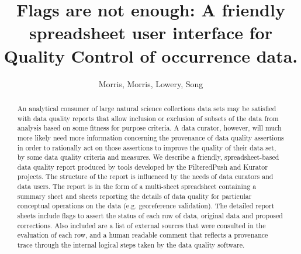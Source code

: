 \documentclass{article}
\begin{document}
\title{Flags are not enough: A friendly spreadsheet user interface for Quality Control of occurrence data.}
\author{Morris, Morris, Lowery, Song}
\begin{abstract}
An analytical consumer of large natural science collections data sets may be satisfied with data quality reports that allow inclusion or exclusion of subsets of the data from analysis based on some fitness for purpose criteria.  A data curator, however, will much more likely need more information concerning the provenance of data quality assertions in order to rationally act on those assertions to improve the quality of their data set, by some data quality criteria and measures.  We describe a friendly, spreadsheet-based data quality report produced by tools developed by the FilteredPush and Kurator projects. The structure of the report is influenced by the needs of data curators and data users.  The report is in the form of a multi-sheet spreadsheet containing a summary sheet and sheets reporting the details of data quality for particular conceptual operations on the data (e.g. georeference validation).  The detailed report sheets include flags to assert the status of each row of data, original data and proposed corrections. Also included are a list of external sources that were consulted in the evaluation of each row, and a human readable comment that reflects a provenance trace through the internal logical steps taken by the data quality software.  
\end{abstract}
\end{document}
